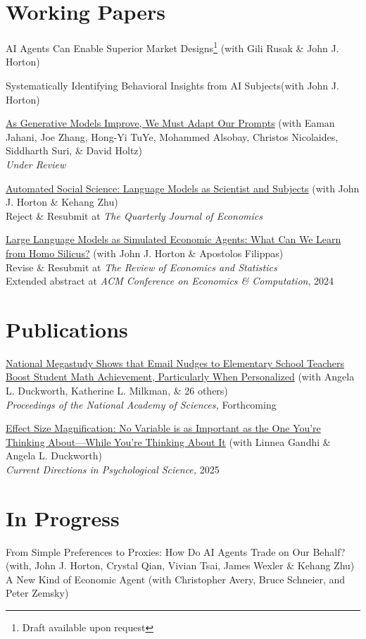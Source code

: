 \documentclass[margin,line,pifont,palatino,courier, 9pt]{res}
\begin{document}
\begin{resume}
\section{\sc Working Papers}

AI Agents Can Enable Superior Market Designs\footnote{Draft available upon request} (with Gili Rusak \& John J. Horton)

Systematically Identifying Behavioral Insights from AI Subjects\footnotemark[\value{footnote}] (with John J. Horton)

\href{https://arxiv.org/abs/2407.14333}{As Generative Models Improve, We Must Adapt Our Prompts} (with Eaman Jahani, Joe Zhang, Hong-Yi TuYe, Mohammed Alsobay, Christos Nicolaides, Siddharth
Suri, \& David Holtz)\\
\textit{Under Review}

\href{https://www.nber.org/papers/w32381}{Automated Social Science: Language Models as Scientist and Subjects} (with John J. Horton \& Kehang Zhu)\\
Reject \& Resubmit at \textit{The Quarterly Journal of Economics}

\href{https://www.nber.org/papers/w31122}{Large Language Models as Simulated Economic Agents: What Can We Learn from Homo Silicus?} (with John J. Horton \& Apostolos Filippas)\\
Revise \& Resubmit at \textit{The Review of Economics and Statistics}\\
Extended abstract at \textit{ACM Conference on Economics \& Computation}, 2024


\section{\sc Publications}
\href{https://www.pnas.org/doi/10.1073/pnas.2418616122}{National Megastudy Shows that Email Nudges to Elementary School Teachers Boost Student Math Achievement, Particularly When Personalized} (with Angela L. Duckworth, Katherine L. Milkman, \& 26 others)\\
\textit{Proceedings of the National Academy of Sciences,} Forthcoming

\href{https://journals.sagepub.com/doi/full/10.1177/09637214241268222}{Effect Size Magnification: No Variable is as Important as the One You're Thinking About---While You're Thinking About It} (with Linnea Gandhi \& Angela L. Duckworth)\\
\textit{Current Directions in Psychological Science,} 2025

\section{\sc In Progress}
From Simple Preferences to Proxies: How Do AI Agents Trade on Our Behalf?
(with, John J. Horton, Crystal Qian, Vivian Tsai, James Wexler \& Kehang Zhu)\\
A New Kind of Economic Agent
(with Christopher Avery, Bruce Schneier, and Peter Zemsky)


\end{resume}
\end{document}
